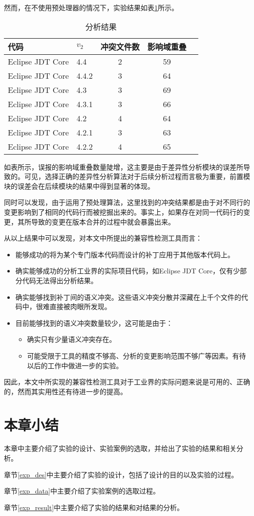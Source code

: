然而，在不使用预处理器的情况下，实验结果如表\ref {data_compatible_2}所示。

\begin{table}[H]
	\caption{分析结果}
	\label{data_compatible_2}
	\centering
	\begin{tabular}{llccc}
		\toprule[1.5pt]
		{\heiti 代码} & {\heiti $v_2$} & {\heiti 冲突文件数} & {\heiti 影响域重叠} \\\midrule[1pt]
		Eclipse JDT Core & 4.4 	& 2 & 59 \\
		Eclipse JDT Core & 4.4.2 & 3 & 64 \\
		Eclipse JDT Core & 4.3 	& 3 & 69 \\
		Eclipse JDT Core & 4.3.1 & 3 & 66 \\
		Eclipse JDT Core & 4.2 	& 4 & 64 \\
		Eclipse JDT Core & 4.2.1 & 3 & 63 \\
		Eclipse JDT Core & 4.2.2 & 4 & 65 \\
		\bottomrule[1.5pt]
	\end{tabular}
\end{table}

如表所示，误报的影响域重叠数量陡增，这主要是由于差异性分析模块的误差所导致的。可见，选择正确的差异性分析算法对于后续分析过程而言极为重要，前置模块的误差会在后续模块的结果中得到显著的体现。

同时可以发现，由于运用了预处理算法，这里找到的冲突结果都是由于对不同行的变更影响到了相同的代码行而被挖掘出来的。事实上，如果存在对同一代码行的变更，其所导致的变更在版本合并的过程中就会暴露出来。

从以上结果中可以发现，对本文中所提出的兼容性检测工具而言：
\begin{itemize}
	\item 能够成功的将为某个专门版本代码而设计的补丁应用于其他版本代码上。
	\item 确实能够成功的分析工业界的实际项目代码，如Eclipse JDT Core，仅有少部分代码无法得出分析结果。
	\item 确实能够找到补丁间的语义冲突。这些语义冲突分散并深藏在上千个文件的代码中，很难直接被肉眼所发现。
	\item 目前能够找到的语义冲突数量较少，这可能是由于：
		\begin{itemize}
			\item 确实只有少量语义冲突存在。
			\item 可能受限于工具的精度不够高、分析的变更影响范围不够广等因素。有待以后的工作中做进一步的实验。
		\end{itemize}
\end{itemize}

因此，本文中所实现的兼容性检测工具对于工业界的实际问题来说是可用的、正确的，然而其实用性还有待进一步的提高。

\section{本章小结}
本章中主要介绍了实验的设计、实验案例的选取，并给出了实验的结果和相关分析。

章节\ref {exp_des}中主要介绍了实验的设计，包括了设计的目的以及实验的过程。

章节\ref {exp_data}中主要介绍了实验案例的选取过程。

章节\ref {exp_result}中主要介绍了实验的结果和对结果的分析。